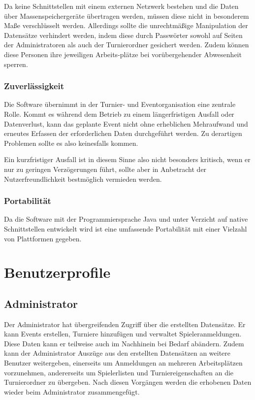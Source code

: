 \documentclass[11pt]{article}
\begin{document}
Da keine Schnittstellen mit einem externen Netzwerk bestehen und die Daten über Massenspeichergeräte übertragen werden, müssen diese nicht in besonderem Maße verschlüsselt werden. Allerdings sollte die unrechtmäßige Manipulation der Datensätze verhindert werden, indem diese durch Passwörter sowohl auf Seiten der Administratoren als auch der Turnierordner gesichert werden. Zudem können diese Personen ihre jeweiligen Arbeits-plätze bei vorübergehender Abwesenheit sperren.

\subsubsection{Zuverlässigkeit}

Die Software übernimmt in der Turnier- und Eventorganisation eine zentrale Rolle. Kommt es während dem Betrieb zu einem längerfristigen Ausfall oder Datenverlust, kann das geplante Event nicht ohne erheblichen Mehraufwand und erneutes Erfassen der erforderlichen Daten durchgeführt werden. Zu derartigen Problemen sollte es also keinesfalls kommen.

Ein kurzfristiger Ausfall ist in diesem Sinne also nicht besonders kritisch, wenn er nur zu geringen Verzögerungen führt, sollte aber in Anbetracht der Nutzerfreundlichkeit bestmöglich vermieden werden.

\subsubsection{Portabilität}

Da die Software mit der Programmiersprache Java und unter Verzicht auf native Schnittstellen entwickelt wird ist eine umfassende Portabilität mit einer Vielzahl von Plattformen gegeben.

\section{Benutzerprofile}

\subsection{Administrator}

Der Administrator hat übergreifenden Zugriff über die erstellten Datensätze. Er kann Events erstellen, Turniere hinzufügen und verwaltet Spieleranmeldungen. Diese Daten kann er teilweise auch im Nachhinein bei Bedarf abändern. Zudem kann der Administrator Auszüge aus den erstellten Datensätzen an weitere Benutzer weitergeben, einerseits um Anmeldungen an mehreren Arbeitsplätzen vorzunehmen, andererseits um Spielerlisten und Turniereigenschaften an die Turnierordner zu übergeben. Nach diesen Vorgängen werden die erhobenen Daten wieder beim Administrator zusammengefügt.
\end{document}
